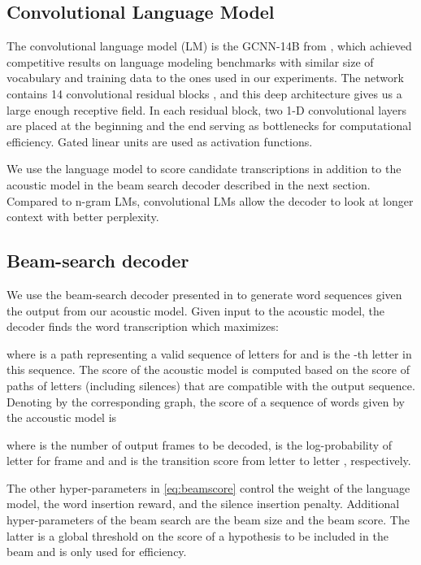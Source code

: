 \documentclass[a4paper]{article}
\begin{document}
\subsection{Convolutional Language Model}
\label{sec:lm}
The convolutional language model (LM) is the GCNN-14B from \cite{glu}, which achieved competitive results on language modeling benchmarks with similar size of vocabulary and training data to the ones used in our experiments. The network contains 14 convolutional residual blocks \cite{resnet}, and this deep architecture gives us a large enough receptive field. In each residual block, two  1-D convolutional layers are placed at the beginning and the end serving as bottlenecks for computational efficiency. Gated linear units are used as activation functions. 

We use the language model to score candidate transcriptions in addition to the acoustic model in the beam search decoder described in the next section. Compared to n-gram LMs, convolutional LMs allow the decoder to look at longer context with better perplexity. 


\subsection{Beam-search decoder}
\label{sec:beam}
We use the beam-search decoder presented in \cite{wav2letter2} to generate word sequences given the output from our acoustic model. Given input  to the acoustic model, the decoder finds the word transcription  which maximizes:

where  is a path representing a valid sequence of letters for  and  is the -th letter in this sequence.
The score of the acoustic model is computed based on the score of paths of letters (including silences) that are compatible with the output sequence. Denoting by  the corresponding graph, the score of a sequence of words  given by the accoustic model is



where  is the number of output frames to be decoded,  is the log-probability of letter  for frame  and and  is the transition score from letter  to letter , respectively. 


The other hyper-parameters  in \eqref{eq:beamscore} control the weight of the language model, the word insertion reward, and the silence insertion penalty. Additional hyper-parameters of the beam search are the beam size and the beam score. The latter is a global threshold on the score of a hypothesis to be included in the beam and is only used for efficiency.
\end{document}
